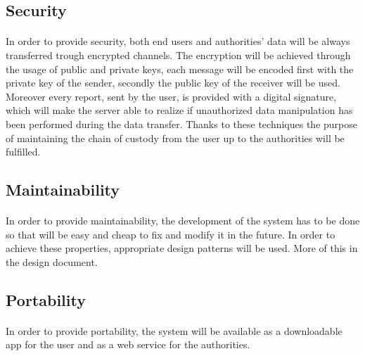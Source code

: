 			\subsection{Security}
				\paragraph{}
					In order to provide security, both end users and authorities' data will be always transferred trough encrypted channels. The encryption will be achieved through the usage of public and private keys, each message will be encoded first with the private key of the sender, secondly the public key of the receiver will be used. Moreover every report, sent by the user, is provided with a digital signature, which will make the server able to realize if unauthorized data manipulation has been performed during the data transfer. Thanks to these techniques the purpose of maintaining the chain of custody from the user up to the authorities will be fulfilled.
			\subsection{Maintainability}
				\paragraph{}
					In order to provide maintainability, the development of the system has to be done so that will be easy and cheap to fix and modify it in the future. In order to achieve these properties, appropriate design patterns will be used. More of this in the design document.
			\subsection{Portability}
				\paragraph{}
					In order to provide portability, the system will be available as a downloadable app for the user and as a web service for the authorities.